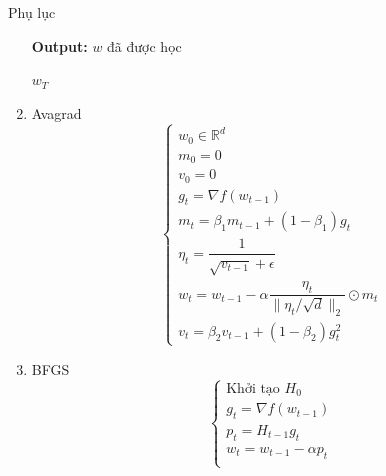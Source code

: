 \documentclass[10pt]{beamer}
\theoremstyle{remark}
\theoremstyle{definition}
\begin{document}
\begin{frame}[allowframebreaks]{Phụ lục}
\begin{enumerate}
{\begin{minipage}{1.2 \linewidth}
\begin{algorithm}[H]
						\hspace*{\algorithmicindent} \textbf{Output:} {$w$ đã được học}
						\begin{algorithmic}[1]
								\Else
								\EndIf
							\EndFor
							\State \Return $w_T$
						\end{algorithmic}
					\end{algorithm}
				\end{minipage}
			}
		\endgroup
		\item Avagrad
		\begin{equation*}
			\begin{cases} w_0 \in \mathbb{R}^d \\ m_0 = 0 \\ v_0 = 0 \\
			g_t = \nabla f(w_{t-1}) \\
			m_t = \beta_1 m_{t-1} + (1-\beta_1)g_t \\
			\eta_t = \dfrac{1}{\sqrt{v_{t-1}} + \epsilon} \\
			w_t = w_{t-1} - \alpha \dfrac{\eta_t}{\lVert \eta_t / \sqrt{d} \rVert_2} \odot m_t \\
			v_t = \beta_2 v_{t-1} + (1 - \beta_2) g_t^2\end{cases}
		\end{equation*}
		\item BFGS
		\begin{equation*}
			\begin{cases} \text{Khởi tạo } H_0 \\
			g_t = \nabla f(w_{t-1}) \\
			p_t = H_{t-1} g_t \\
			w_t = w_{t-1} - \alpha p_t \\

\end{cases}
\end{equation*}
\end{enumerate}
\end{frame}
\end{document}
